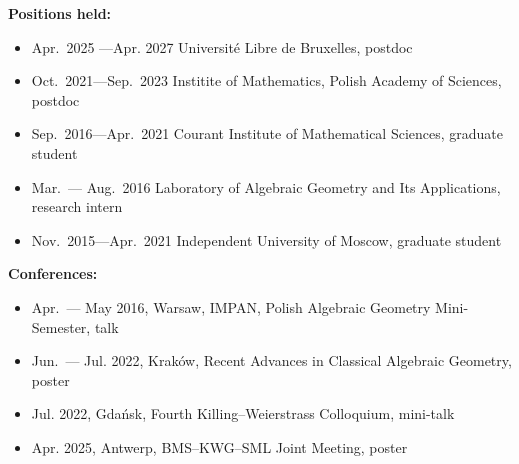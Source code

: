 \documentclass{article}
\begin{document}
\begin{description}
\item {\bf Positions held:} \begin{itemize}
     \item Apr.~2025 ---Apr.  2027 \hspace{2mm} Universit\'e Libre de Bruxelles,  postdoc
     \item Oct.~2021---Sep.~2023 \hspace{2mm} Institite of Mathematics,  Polish Academy of Sciences,  postdoc
     \item Sep.~2016---Apr.~2021 \hspace{2mm} Courant Institute of Mathematical Sciences,
     graduate student
     \item Mar.~--- Aug.~2016 \hspace{2mm} Laboratory of Algebraic Geometry
	and Its Applications, research intern
     \item Nov.~2015---Apr.~2021 \hspace{2mm} Independent University of Moscow,
     graduate student
\end{itemize}

\vspace{1mm}

\item {\bf Conferences:} \begin{itemize}
\item Apr.~--- May 2016,  Warsaw,  IMPAN,  Polish Algebraic Geometry Mini-Semester, talk
\item Jun.~--- Jul. 2022, Krak\'ow, Recent Advances in Classical Algebraic Geometry, poster
\item Jul.  2022,  Gda\'nsk,  Fourth Killing--Weierstrass Colloquium, mini-talk
\item Apr. 2025, Antwerp, BMS--KWG--SML Joint Meeting, poster
\end{itemize}

\vspace{1mm}


\end{description}
\end{document}
